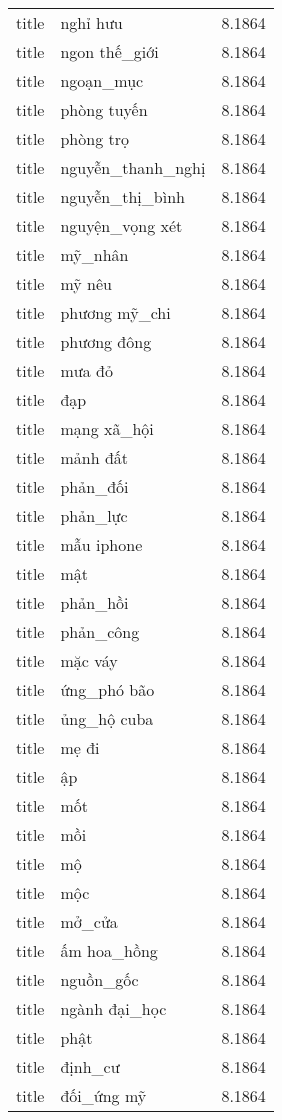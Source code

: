 \documentclass{article}
\begin{document}
\begin{tabular}{lll}
title & nghỉ hưu & 8.1864\\
title & ngon thế\_giới & 8.1864\\
title & ngoạn\_mục & 8.1864\\
title & phòng tuyến & 8.1864\\
title & phòng trọ & 8.1864\\
title & nguyễn\_thanh\_nghị & 8.1864\\
title & nguyễn\_thị\_bình & 8.1864\\
title & nguyện\_vọng xét & 8.1864\\
title & mỹ\_nhân & 8.1864\\
title & mỹ nêu & 8.1864\\
title & phương mỹ\_chi & 8.1864\\
title & phương đông & 8.1864\\
title & mưa đỏ & 8.1864\\
title & đạp & 8.1864\\
title & mạng xã\_hội & 8.1864\\
title & mảnh đất & 8.1864\\
title & phản\_đối & 8.1864\\
title & phản\_lực & 8.1864\\
title & mẫu iphone & 8.1864\\
title & mật & 8.1864\\
title & phản\_hồi & 8.1864\\
title & phản\_công & 8.1864\\
title & mặc váy & 8.1864\\
title & ứng\_phó bão & 8.1864\\
title & ủng\_hộ cuba & 8.1864\\
title & mẹ đi & 8.1864\\
title & ập & 8.1864\\
title & mốt & 8.1864\\
title & mồi & 8.1864\\
title & mộ & 8.1864\\
title & mộc & 8.1864\\
title & mở\_cửa & 8.1864\\
title & ấm hoa\_hồng & 8.1864\\
title & nguồn\_gốc & 8.1864\\
title & ngành đại\_học & 8.1864\\
title & phật & 8.1864\\
title & định\_cư & 8.1864\\
title & đối\_ứng mỹ & 8.1864\\

\end{tabular}
\end{document}
